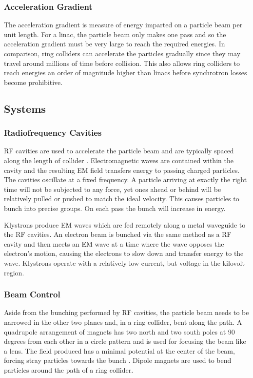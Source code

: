  \subsubsection{Acceleration Gradient}
 
 The acceleration gradient is measure of energy imparted on a particle beam per unit length. For a linac, the particle beam only makes one pass and so the acceleration gradient must be very large to reach the required energies. In comparison, ring colliders can accelerate the particles gradually since they may travel around millions of time before collision. This also allows ring colliders to reach energies an order of magnitude higher than linacs before synchrotron losses become prohibitive.
 
 \subsection{Systems}
 \subsubsection{Radiofrequency Cavities}
 
 RF cavities are used to accelerate the particle beam and are typically spaced along the length of collider \cite{CERN:RFCAV}. Electromagnetic waves 
are contained within the cavity and the resulting EM field transfers energy to passing charged particles. The cavities oscillate at a fixed frequency. A particle arriving at exactly the right time will not be subjected to any force, yet ones ahead or behind will be relatively pulled or pushed to match the ideal velocity. This causes particles to bunch into precise groups. On each pass the bunch will increase in energy.

Klystrons produce EM waves which are fed remotely along a metal waveguide to  the RF cavities. An electron beam is bunched via the same method as a RF cavity and then meets an EM wave at a time where the wave opposes the electron's motion, causing the electrons to slow down and transfer energy to the wave. Klystrons operate with a relatively low current, but voltage in the kilovolt region.
 
 \subsubsection{Beam Control}
 
 Aside from the bunching performed by RF cavities, the particle beam needs to be narrowed in the other two planes and, in a ring collider, bent along the path. A quadrupole arrangement of magnets has two north and two south poles at 90 degrees from each other in a circle pattern and is used for focusing the beam like a lens. The field produced has a minimal potential at the center of the beam, forcing stray particles towards the bunch \cite{ILC:BeamFocusing}. Dipole magnets are used to bend particles around the path of a ring collider. 
 
